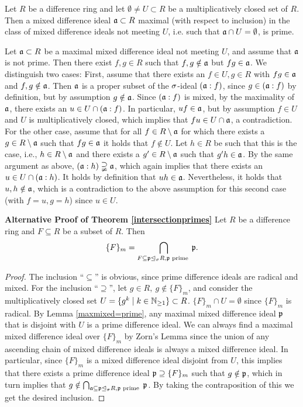 \begin{lem}\label{maxmixed=prime}
Let $R$ be a difference ring and let $\emptyset \neq U \subset R$ be a multiplicatively closed set of $R$. Then a mixed difference ideal $\mathfrak{a} \subset R$ maximal (with respect to inclusion) in the class of mixed difference
ideals not meeting $U$, i.e. such that $\mathfrak{a} \cap U = \emptyset$, is prime. 
\begin{bew}
Let $\mathfrak{a} \subset R$ be a maximal mixed difference ideal not meeting $U$, and assume that $\mathfrak{a}$ is not prime. Then there exist $f, g \in R$ such that $f,g \notin \mathfrak{a}$ but $fg \in \mathfrak{a}$.
We distinguish two cases: First, assume that there exists an $f \in U, g \in R$ with $fg \in \mathfrak{a}$ and $f, g \notin \mathfrak{a}$. Then $\mathfrak{a}$ is a proper subset of the $\sigma$-ideal $(\mathfrak{a}:f)$, since $g \in (\mathfrak{a}:f)$ by definition, but by assumption $g \notin \mathfrak{a}$.
Since $(\mathfrak{a}:f)$ is mixed, by the maximality of $\mathfrak{a}$, there exists an $u \in U \cap (\mathfrak{a}:f)$. In particular, $uf \in \mathfrak{a}$, but by assumption $f \in U$ and $U$ is multiplicatively closed, which implies that $fu \in U \cap \mathfrak{a}$, a contradiction. \\
For the other case, assume that for all $f \in R \setminus \mathfrak{a}$ for which there exists a $g \in R \setminus \mathfrak{a}$ such that $fg \in \mathfrak{a}$ it holds that $f \notin U$. Let $h \in R$ be such that this is the case, i.e., $h \in R \setminus \mathfrak{a}$ and there exists a $g' \in R \setminus \mathfrak{a}$ such that $g'h \in \mathfrak{a}$.
By the same argument as above, $(\mathfrak{a}:h) \supsetneqq \mathfrak{a}$, which again implies that there exists an $u \in U \cap (\mathfrak{a}:h)$. It holds by definition that $uh \in \mathfrak{a}$. Nevertheless,  it holds that $u,h \notin \mathfrak{a}$, which is a contradiction to the above assumption for this second case (with $f = u, g = h$) since $u \in U$. 
\end{bew}
\end{lem}

\noindent \textbf{Alternative Proof of Theorem \ref{intersectionprimes}} 
Let $R$ be a difference ring and $F \subseteq R$ be a subset of $R$. Then
\[ \{ F \}_m = \bigcap_{F \subseteq \mathfrak{p} \unlhd_{\sigma} R, \mathfrak{p} \text{ prime }} \mathfrak{p}.\]
\begin{proof}
The inclusion ``$\subseteq$'' is obvious, since prime difference ideals are radical and mixed. For the inclusion ``$\supseteq$'', let $g \in R, ~ g \notin \{ F \}_m$, and consider the multiplicatively closed set $U = \{ g^k \mid k \in \mathbb{N}_{\geq1} \} \subset R$. 
$\{ F \}_m \cap U = \emptyset$ since $\{ F \}_m$ is radical. By Lemma \ref{maxmixed=prime}, any maximal mixed difference ideal $\mathfrak{p}$ that is disjoint with $U$ is a prime difference ideal. We can always find a maximal mixed difference ideal over $\{F\}_m$ by Zorn's Lemma since
the union of any ascending chain of mixed difference ideals is always a mixed difference ideal. In particular, since $\{F\}_m$ is a mixed difference ideal disjoint from $U$, this implies that there exists a prime difference ideal $\mathfrak{p} \supseteq \{F\}_m$ such that $g \notin \mathfrak{p}$,
which in turn implies that $g \notin \bigcap_{\mathfrak{a} \subseteq \mathfrak{p} \unlhd_{\sigma} R, \mathfrak{p} \text{ prime }} \mathfrak{p}$. By taking the contraposition of this we get the desired inclusion.
\end{proof}


